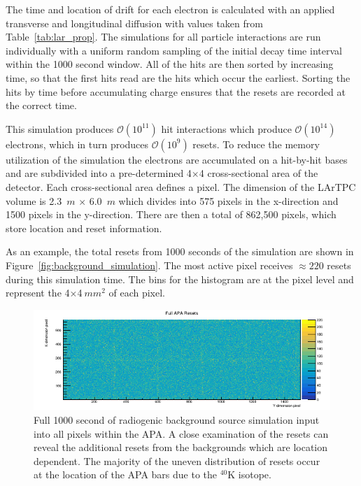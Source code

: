 The time and location of drift for each electron is calculated with an applied transverse and longitudinal diffusion with values taken from Table~\ref{tab:lar_prop}.
The simulations for all particle interactions are run individually with a uniform random sampling of the initial decay time interval within the 1000 second window.
All of the hits are then sorted by increasing time, so that the first hits read are the hits which occur the earliest.
Sorting the hits by time before accumulating charge ensures that the resets are recorded at the correct time.

This simulation produces $\mathcal{O}(10^{11})$ hit interactions which produce $\mathcal{O}(10^{14})$ electrons, which in turn produces $\mathcal{O}(10^{9})$ resets.
To reduce the memory utilization of the simulation the electrons are accumulated on a hit-by-hit bases and are subdivided into a pre-determined 4$\times$4 cross-sectional area of the detector.
Each cross-sectional area defines a pixel.
The dimension of the LArTPC volume is 2.3~$\unit{m}$ $\times$ 6.0~$\unit{m}$ which divides into 575 pixels in the x-direction and 1500 pixels in the y-direction.
There are then a total of 862,500 pixels, which store location and reset information.

As an example, the total resets from 1000 seconds of the simulation are shown in Figure~\ref{fig:background_simulation}.
The most active pixel receives $\approx 220$ resets during this simulation time.
The bins for the histogram are at the pixel level and represent the 4$\times$4$~\unit{mm^{2}}$ of each pixel.

\begin{figure}[]
\centering
\includegraphics[width=\textwidth]{images/fullApaResets.png}
\caption{Full 1000 second of radiogenic background source simulation input into all pixels within the APA.
A close examination of the resets can reveal the additional resets from the backgrounds which are location dependent.
The majority of the uneven distribution of resets occur at the location of the APA bars due to the $^{40}$K isotope.
}
\end{figure}~\label{fig:background_simulation}

